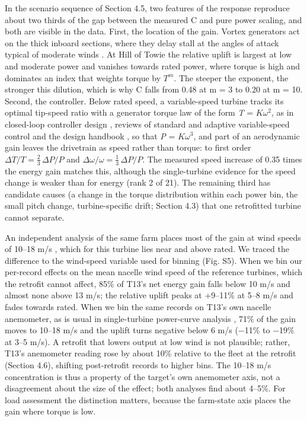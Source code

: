 \documentclass[preprint,12pt]{elsarticle}
\begin{document}
In the scenario sequence of Section 4.5, two features of the response reproduce about two thirds of the gap between the measured C and pure power scaling, and both are visible in the data. First, the location of the gain. Vortex generators act on the thick inboard sections, where they delay stall at the angles of attack typical of moderate winds \cite{lin02,zhao}. At Hill of Towie the relative uplift is largest at low and moderate power and vanishes towards rated power, where torque is high and dominates an index that weights torque by \(T^m\). The steeper the exponent, the stronger this dilution, which is why C falls from 0.48 at m = 3 to 0.20 at m = 10. Second, the controller. Below rated speed, a variable-speed turbine tracks its optimal tip-speed ratio with a generator torque law of the form \emph{T} = \(K\omega^2\), as in closed-loop controller design \cite{bossanyi00}, reviews of standard and adaptive variable-speed control \cite{johnson06} and the design handbook \cite{burton11}, so that \emph{P} = \(K\omega^3\), and part of an aerodynamic gain leaves the drivetrain as speed rather than torque: to first order \(\Delta T/T = \tfrac{2}{3}\,\Delta P/P\) and \(\Delta\omega/\omega = \tfrac{1}{3}\,\Delta P/P\). The measured speed increase of 0.35 times the energy gain matches this, although the single-turbine evidence for the speed change is weaker than for energy (rank 2 of 21). The remaining third has candidate causes (a change in the torque distribution within each power bin, the small pitch change, turbine-specific drift; Section 4.3) that one retrofitted turbine cannot separate.

An independent analysis of the same farm places most of the gain at wind speeds of 10--18 m/s \cite{wang}, which for this turbine lies near and above rated. We traced the difference to the wind-speed variable used for binning (Fig. S5). When we bin our per-record effects on the mean nacelle wind speed of the reference turbines, which the retrofit cannot affect, 85\% of T13's net energy gain falls below 10 m/s and almost none above 13 m/s; the relative uplift peaks at +9--11\% at 5--8 m/s and fades towards rated. When we bin the same records on T13's own nacelle anemometer, as is usual in single-turbine power-curve analysis \cite{iec}, 71\% of the gain moves to 10--18 m/s and the uplift turns negative below 6 m/s (−11\% to −19\% at 3--5 m/s). A retrofit that lowers output at low wind is not plausible; rather, T13's anemometer reading rose by about 10\% relative to the fleet at the retrofit (Section 4.6), shifting post-retrofit records to higher bins. The 10--18 m/s concentration is thus a property of the target's own anemometer axis, not a disagreement about the size of the effect; both analyses find about 4--5\%. For load assessment the distinction matters, because the farm-state axis places the gain where torque is low.
\end{document}
